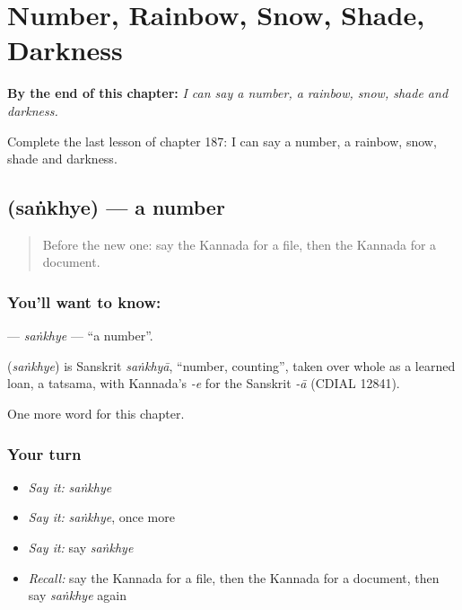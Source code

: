 
\chapter{Number, Rainbow, Snow, Shade, Darkness}
\label{ch:ka-number-rainbow-snow-shade-darkness}

\begin{chapteropening}
\textbf{By the end of this chapter:} \emph{I can say a number, a rainbow, snow, shade and darkness.}

Complete the last lesson of chapter 187: I can say a number, a rainbow, snow, shade and darkness.
\end{chapteropening}

\section[\texorpdfstring{\kn{ಸಂಖ್ಯೆ} (saṅkhye)}{ಸಂಖ್ಯೆ (saṅkhye)}]{ (saṅkhye) — a number}

\label{lesson:KA-C187-sankhye}



\begin{quote}
Before the new one: say the Kannada for a file, then the Kannada for a document.
\end{quote}

\subsection*{You'll want to know: }
\textbf{} — \emph{saṅkhye} — \textquotedblleft{}a number\textquotedblright{}.

\begin{cousinweb}
\textbf{} (\emph{saṅkhye}) is Sanskrit \emph{saṅkhyā}, \textquotedblleft{}number, counting\textquotedblright{}, taken over whole as a learned loan, a tatsama, with Kannada's \emph{-e} for the Sanskrit \emph{-ā} (CDIAL 12841).
\end{cousinweb}

\begin{grammarlens}[title={What you've built}]
One more word for this chapter.
\end{grammarlens}

\subsection*{Your turn}
\begin{itemize}
\raggedright
  \item \emph{Say it:} \emph{saṅkhye}
  \item \emph{Say it:} \emph{saṅkhye}, once more
  \item \emph{Say it:} say \emph{saṅkhye}
  \item \emph{Recall:} say the Kannada for a file, then the Kannada for a document, then say \emph{saṅkhye} again
\end{itemize}

